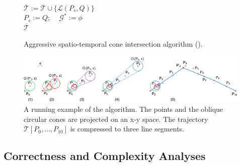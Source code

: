 {\begin{figure}[tb!]
\begin{center}
{\begin{minipage}{3.36in}
{	\icc \>\hspace{3ex} \Else\\
	\icc \> \hspace{6ex} $\overline{\mathcal{T}} := \overline{\mathcal{T}}\cup \{\mathcal{L}(P_s,Q)\}$ \\
	\icc \> \hspace{6ex} $P_s := Q$;  ~~$\mathcal{G}^* := \phi$ \\
	\icc \hspace{1ex}\Return $\overline{\mathcal{T}}$
%
%
}
\vspace{-2ex}
\myhrule
\end{minipage}
}
\end{center}
\vspace{-2ex}
\caption{\small Aggressive spatio-temporal cone intersection algorithm (\cista).}
\label{alg:ciseda}
\vspace{-2ex}
\end{figure}
}%




\begin{figure}[tb!]
\centering
\includegraphics[scale=0.8]{figures/Fig-conesta.png}
\vspace{-1ex}
\caption{\small A running example of the \cista algorithm. The points and the oblique circular cones are projected on an x-y space. The trajectory $\dddot{\mathcal{T}}[P_0, \ldots, P_{10}]$ is compressed to three line segments.}
\vspace{-2ex}
\label{fig:exm-consta}
\end{figure}



\subsection{Correctness and Complexity Analyses}

